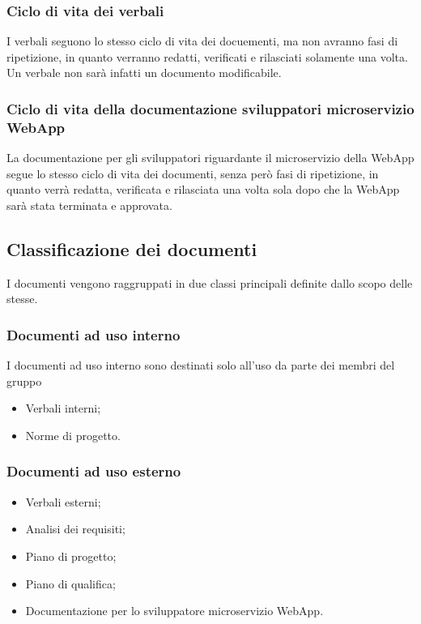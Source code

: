 \subsubsection{Ciclo di vita dei verbali}

I verbali seguono lo stesso ciclo di vita dei docuementi, ma non avranno fasi di ripetizione, in quanto verranno redatti, verificati e rilasciati solamente una volta. Un verbale non sarà infatti un documento modificabile.

\subsubsection{Ciclo di vita della documentazione sviluppatori microservizio WebApp}

La documentazione per gli sviluppatori riguardante il microservizio della WebApp segue lo stesso ciclo di vita dei documenti, senza però fasi di ripetizione, in quanto verrà redatta, verificata e rilasciata una volta sola dopo che la WebApp sarà stata terminata e approvata.

\subsection{Classificazione dei documenti}

I documenti vengono raggruppati in due classi principali definite dallo scopo delle stesse.

\subsubsection{Documenti ad uso interno}

I documenti ad uso interno sono destinati solo all'uso da parte dei membri del gruppo 

\begin{itemize}
    \item Verbali interni;
    \item Norme di progetto.
\end{itemize}

\subsubsection{Documenti ad uso esterno}

\begin{itemize}
    \item Verbali esterni;
    \item Analisi dei requisiti;
    \item Piano di progetto;
    \item Piano di qualifica;
    \item Documentazione per lo sviluppatore microservizio WebApp.
\end{itemize}

